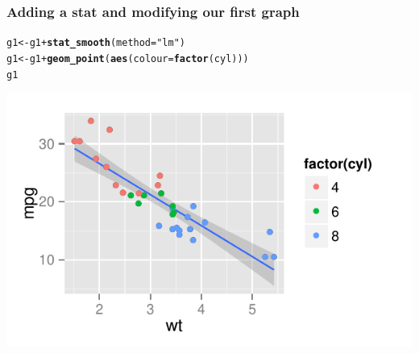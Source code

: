 \documentclass{beamer}\usepackage{graphicx, color}
\makeatletter
\def\maxwidth{ %
  \ifdim\Gin@nat@width>\linewidth
    \linewidth
  \else
    \Gin@nat@width
  \fi
}
\newcommand{\hlfunctioncall}[1]{\textcolor[rgb]{0.501960784313725,0,0.329411764705882}{\textbf{#1}}}%
\newcommand{\hlstring}[1]{\textcolor[rgb]{0.6,0.6,1}{#1}}%
\newenvironment{kframe}{%
 \def\at@end@of@kframe{}%
 \ifinner\ifhmode%
  \def\at@end@of@kframe{\end{minipage}}%
  \begin{minipage}{\columnwidth}%
 \fi\fi%
 \def\FrameCommand##1{\hskip\@totalleftmargin \hskip-\fboxsep
 \colorbox{shadecolor}{##1}\hskip-\fboxsep
     \hskip-\linewidth \hskip-\@totalleftmargin \hskip\columnwidth}%
 \MakeFramed {\advance\hsize-\width
   \@totalleftmargin\z@ \linewidth\hsize
   \@setminipage}}%
 {\par\unskip\endMakeFramed%
 \at@end@of@kframe}
\newenvironment{knitrout}{}{} %
\makeatother
\begin{document}
\begin{frame}[fragile]
  \frametitle{Adding a stat and modifying our first graph}
\begin{knitrout}
\color{fgcolor}\begin{kframe}
\begin{alltt}
g1 <- g1 + \hlfunctioncall{stat_smooth}(method = \hlstring{"lm"})
g1 <- g1 + \hlfunctioncall{geom_point}(\hlfunctioncall{aes}(colour = \hlfunctioncall{factor}(cyl)))
g1
\end{alltt}
\end{kframe}
\includegraphics[width=\maxwidth]{figure/first-modify} 

\end{knitrout}


\end{frame}
\end{document}
